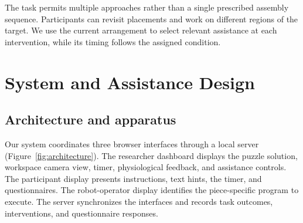 \documentclass[sigconf]{aamas}
\begin{document}
The task permits multiple approaches rather than a single prescribed assembly sequence. Participants can revisit placements and work on different regions of the target. We use the current arrangement to select relevant assistance at each intervention, while its timing follows the assigned condition.

\section{System and Assistance Design}

\subsection{Architecture and apparatus}

Our system coordinates three browser interfaces through a local server (Figure~\ref{fig:architecture}). The researcher dashboard displays the puzzle solution, workspace camera view, timer, physiological feedback, and assistance controls. The participant display presents instructions, text hints, the timer, and questionnaires. The robot-operator display identifies the piece-specific program to execute. The server synchronizes the interfaces and records task outcomes, interventions, and questionnaire responses.
\end{document}
